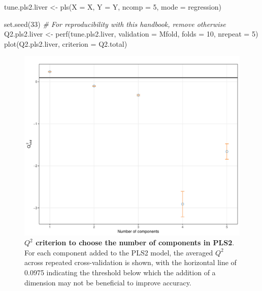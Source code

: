 \documentclass[
]{book}
\newenvironment{Shaded}{\begin{snugshade}}{\end{snugshade}}
\newcommand{\AttributeTok}[1]{\textcolor[rgb]{0.77,0.63,0.00}{#1}}
\newcommand{\CommentTok}[1]{\textcolor[rgb]{0.56,0.35,0.01}{\textit{#1}}}
\newcommand{\DecValTok}[1]{\textcolor[rgb]{0.00,0.00,0.81}{#1}}
\newcommand{\FunctionTok}[1]{\textcolor[rgb]{0.00,0.00,0.00}{#1}}
\newcommand{\NormalTok}[1]{#1}
\newcommand{\OtherTok}[1]{\textcolor[rgb]{0.56,0.35,0.01}{#1}}
\newcommand{\StringTok}[1]{\textcolor[rgb]{0.31,0.60,0.02}{#1}}
\begin{document}
\begin{Shaded}
\begin{Highlighting}[]
\NormalTok{tune.pls2.liver }\OtherTok{\textless{}{-}} \FunctionTok{pls}\NormalTok{(}\AttributeTok{X =}\NormalTok{ X, }\AttributeTok{Y =}\NormalTok{ Y, }\AttributeTok{ncomp =} \DecValTok{5}\NormalTok{, }\AttributeTok{mode =} \StringTok{\textquotesingle{}regression\textquotesingle{}}\NormalTok{)}

\FunctionTok{set.seed}\NormalTok{(}\DecValTok{33}\NormalTok{)  }\CommentTok{\# For reproducibility with this handbook, remove otherwise}
\NormalTok{Q2.pls2.liver }\OtherTok{\textless{}{-}} \FunctionTok{perf}\NormalTok{(tune.pls2.liver, }\AttributeTok{validation =} \StringTok{\textquotesingle{}Mfold\textquotesingle{}}\NormalTok{, }\AttributeTok{folds =} \DecValTok{10}\NormalTok{, }
                      \AttributeTok{nrepeat =} \DecValTok{5}\NormalTok{)}
\FunctionTok{plot}\NormalTok{(Q2.pls2.liver, }\AttributeTok{criterion =} \StringTok{\textquotesingle{}Q2.total\textquotesingle{}}\NormalTok{)}
\end{Highlighting}
\end{Shaded}

\begin{figure}

{\centering \includegraphics[width=0.7\linewidth]{Figures/PLS/04-spls2-ncomp-1} 

}

\caption{\textbf{\(Q^2\) criterion to choose the number of components in PLS2}. For each component added to the PLS2 model, the averaged \(Q^2\) across repeated cross-validation is shown, with the horizontal line of 0.0975 indicating the threshold below which the addition of a dimension may not be beneficial to improve accuracy.}\label{fig:04-spls2-ncomp}
\end{figure}
\end{document}
